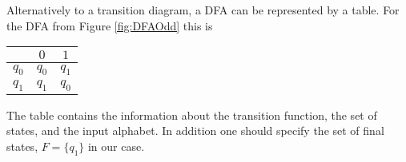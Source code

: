 

\setcounter{section}{1}
\setcounter{subsection}{2}
\setcounter{dfn}{5}

\begin{rem}
Alternatively to a transition diagram, a DFA can be represented by a table.
For the DFA from Figure \ref{fig:DFAOdd} this is
\begin{center}
\begin{tabular}{c|cc}
& $0$ & $1$\\
\hline
$q_0$ & $q_0$ & $q_1$\\
$q_1$ & $q_1$ & $q_0$
\end{tabular}
\end{center}
The table contains the information about the transition function, the set of states, and the input alphabet.
In addition one should specify the set of final states, $F = \{q_1\}$ in our case.
\end{rem}

